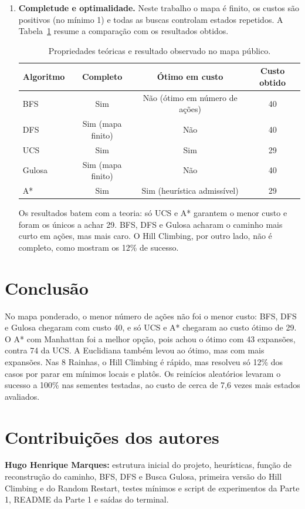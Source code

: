 \documentclass[12pt]{article}
\begin{document}
\begin{enumerate}
\item \textbf{Completude e optimalidade.} Neste trabalho o mapa é finito, os custos são positivos (no mínimo 1) e todas as buscas controlam estados repetidos. A Tabela~\ref{tab:prop} resume a comparação com os resultados obtidos.

\begin{table}[H]
\centering
\caption{Propriedades teóricas e resultado observado no mapa público.}
\label{tab:prop}
\begin{tabular}{lccc}
\toprule
Algoritmo & Completo & Ótimo em custo & Custo obtido \\
\midrule
BFS    & Sim & Não (ótimo em número de ações) & 40 \\
DFS    & Sim (mapa finito) & Não & 40 \\
UCS    & Sim & Sim & 29 \\
Gulosa & Sim (mapa finito) & Não & 40 \\
A*     & Sim & Sim (heurística admissível) & 29 \\
\bottomrule
\end{tabular}
\end{table}

Os resultados batem com a teoria: só UCS e A* garantem o menor custo e foram os únicos a achar 29. BFS, DFS e Gulosa acharam o caminho mais curto em ações, mas mais caro. O Hill Climbing, por outro lado, não é completo, como mostram os 12\% de sucesso.
\end{enumerate}

\section{Conclusão}
No mapa ponderado, o menor número de ações não foi o menor custo: BFS, DFS e Gulosa chegaram com custo 40, e só UCS e A* chegaram ao custo ótimo de 29. O A* com Manhattan foi a melhor opção, pois achou o ótimo com 43 expansões, contra 74 da UCS. A Euclidiana também levou ao ótimo, mas com mais expansões. Nas 8 Rainhas, o Hill Climbing é rápido, mas resolveu só 12\% dos casos por parar em mínimos locais e platôs. Os reinícios aleatórios levaram o sucesso a 100\% nas sementes testadas, ao custo de cerca de 7,6 vezes mais estados avaliados.

\section*{Contribuições dos autores}
\textbf{Hugo Henrique Marques:} estrutura inicial do projeto, heurísticas, função de reconstrução do caminho, BFS, DFS e Busca Gulosa, primeira versão do Hill Climbing e do Random Restart, testes mínimos e script de experimentos da Parte 1, README da Parte 1 e saídas do terminal.
\end{document}

